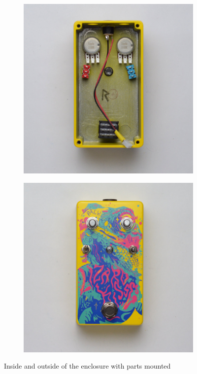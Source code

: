 \documentclass[a4paper,12pt]{article}
\begin{document}
\begin{figure}[h!]
  \centering
  \begin{subfigure}[b]{0.49\textwidth}
    \centering
    \includegraphics[width=\textwidth]{build/09-enclosure-mount-inside-1000px.jpg}
  \end{subfigure}
  \begin{subfigure}[b]{0.49\textwidth}
    \centering
    \includegraphics[width=\textwidth]{build/08-enclosure-mount-1000px.jpg}
  \end{subfigure}
  \caption{Inside and outside of the enclosure with parts
  mounted}
\end{figure}
\end{document}
